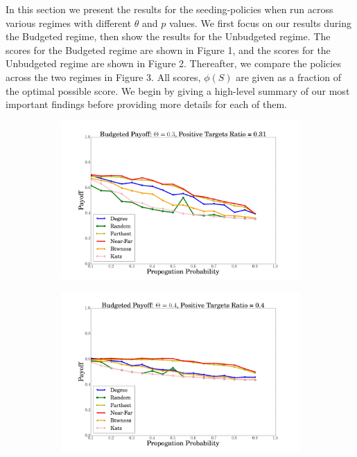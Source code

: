 In this section we present the results for the seeding-policies when run across various regimes with different $\theta$ and $p$ values. We first focus on our results during the Budgeted regime, then show the results for the Unbudgeted regime. The scores for the Budgeted regime are shown in Figure 1, and the scores for the Unbudgeted regime are shown in Figure 2. Thereafter, we compare the policies across the two regimes in Figure 3. All scores, $\phi(S)$ are given as a fraction of the optimal possible score. We begin by giving a high-level summary of our most important findings before providing more details for each of them.


 \begin{figure}
  \begin{subfigure}{\linewidth}
  \includegraphics[width=1\textwidth]{../plots/budgeted/theta=3.png}
  \end{subfigure}\par\medskip
  \begin{subfigure}{\linewidth}
\includegraphics[width=1\textwidth]{../plots/budgeted/theta=4.png}
  \end{subfigure}\par\medskip
  

\end{figure}
